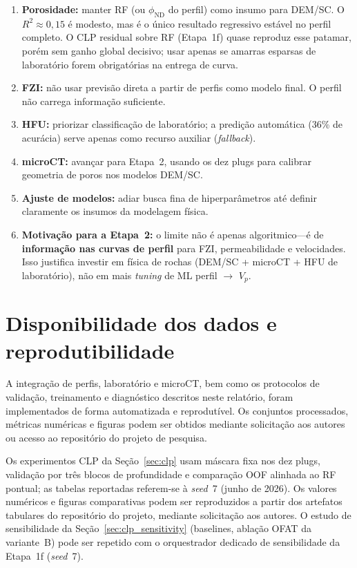 \documentclass[11pt,a4paper]{article}
\newcommand{\phiND}{\ensuremath{\phi_{\mathrm{ND}}}}
\begin{document}
\begin{enumerate}
  \item \textbf{Porosidade:} manter RF (ou \phiND{} do perfil) como
        insumo para DEM/SC. O $R^2 \approx 0{,}15$ é modesto, mas é o
        único resultado regressivo estável no perfil completo. O CLP
        residual sobre RF (Etapa~1f) quase reproduz esse patamar, porém
        sem ganho global decisivo; usar apenas se amarras esparsas de
        laboratório forem obrigatórias na entrega de curva.
  \item \textbf{FZI:} não usar previsão direta a partir de perfis como
        modelo final. O perfil não carrega informação suficiente.
  \item \textbf{HFU:} priorizar classificação de laboratório;
        a predição automática (36\% de acurácia) serve apenas como
        recurso auxiliar (\emph{fallback}).
  \item \textbf{microCT:} avançar para Etapa~2, usando os dez plugs para
        calibrar geometria de poros nos modelos DEM/SC.
  \item \textbf{Ajuste de modelos:} adiar busca fina de hiperparâmetros
        até definir claramente os insumos da modelagem física.
  \item \textbf{Motivação para a Etapa~2:} o limite não é apenas
        algoritmico---é de \textbf{informação nas curvas de perfil}
        para FZI, permeabilidade e velocidades. Isso justifica investir em
        física de rochas (DEM/SC + microCT + HFU de laboratório), não em
        mais \emph{tuning} de ML perfil $\rightarrow$ $V_p$.
\end{enumerate}

\section*{Disponibilidade dos dados e reprodutibilidade}

A integração de perfis, laboratório e microCT, bem como os
protocolos de validação, treinamento e diagnóstico descritos neste
relatório, foram implementados de forma automatizada e reprodutível.
Os conjuntos processados, métricas numéricas e figuras podem ser
obtidos mediante solicitação aos autores ou acesso ao repositório
do projeto de pesquisa.

Os experimentos CLP da Seção~\ref{sec:clp} usam máscara fixa nos dez
plugs, validação por três blocos de profundidade e comparação OOF
alinhada ao RF pontual; as tabelas reportadas referem-se à \emph{seed}~7
(junho de 2026).
Os valores numéricos e figuras comparativas podem ser reproduzidos a
partir dos artefatos tabulares do repositório do projeto, mediante
solicitação aos autores.
O estudo de sensibilidade da Seção~\ref{sec:clp_sensitivity} (baselines,
ablação OFAT da variante~B) pode ser repetido com o orquestrador
dedicado de sensibilidade da Etapa~1f (\emph{seed}~7).
\end{document}
